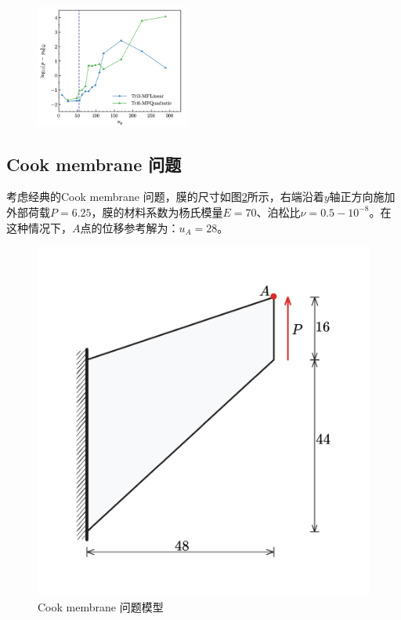 \begin{figure}[H]
\begin{subcaptiongroup}
    \label{hole_32_L2_u}
    \includegraphics[width=0.45\textwidth]{figures/ch_4/plate_with_hole_4_L2_p.png}
    \label{hole_32_L2_p}
    \end{subcaptiongroup}
\caption{}
\label{ch_4:fig:hole_l2}
\end{figure}

\subsection{Cook membrane 问题}
考虑经典的Cook membrane 问题，膜的尺寸如图\ref{ch_4:fig:cook}所示，右端沿着$y$轴正方向施加外部荷载$P=6.25$，膜的材料系数为杨氏模量$E=70$、泊松比$\nu=0.5-10^{-8}$。在这种情况下，$A$点的位移参考解为：$u_A=28$。
\begin{figure}[!h]
    \centering 
        \includegraphics[scale=0.3]{figures/ch_4/cook.png}
        \caption{Cook membrane 问题模型}\label{ch_4:fig:cook}
\end{figure}

